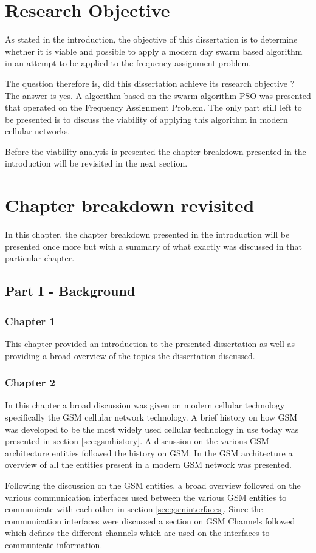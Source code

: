 \section{Research Objective}
As stated in the introduction, the objective of this dissertation is to determine whether it is viable and possible to apply a modern day swarm based algorithm in an attempt to be applied to the frequency assignment problem. 

The question therefore is, did this dissertation achieve its research objective ? The answer is yes. A algorithm based on the swarm algorithm PSO was presented that operated on the Frequency Assignment Problem. The only part still left to be presented is to discuss the viability of applying this algorithm in modern cellular networks.

Before the viability analysis is presented the chapter breakdown presented in the introduction will be revisited in the next section.

\section{Chapter breakdown revisited}
In this chapter, the chapter breakdown presented in the introduction will be presented once more but with a summary of what exactly was discussed in that particular chapter.
\subsection{Part I - Background}
\subsubsection{Chapter 1}
This chapter provided an introduction to the presented dissertation as well as providing a broad overview of the topics the dissertation discussed. 
\subsubsection{Chapter 2}
In this chapter a broad discussion was given on modern cellular technology specifically the GSM cellular network technology. A brief history on how GSM was developed to be the most widely used cellular technology in use today was presented in section \ref{sec:gsmhistory}. A discussion on the various GSM architecture entities followed the history on GSM. In the GSM architecture a overview of all the entities present in a modern GSM network was presented.

Following the discussion on the GSM entities, a broad overview followed on the various communication interfaces used between the various GSM entities to communicate with each other in section \ref{sec:gsminterfaces}. Since the communication interfaces were discussed a section on GSM Channels followed which defines the different channels which are used on the interfaces to communicate information.

